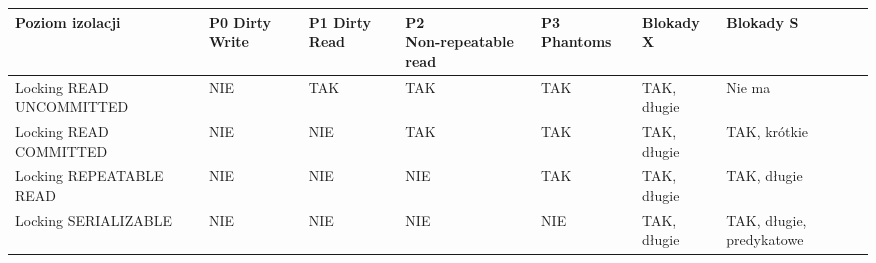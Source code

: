 \documentclass[a5paper,6pt]{article}
\begin{document}
\begin{adjustbox}{width=\columnwidth,center}
    \begin{tabular}{|p{3cm}|p{1cm}|p{1cm}|p{2cm}|p{1cm}|p{1.3cm}|p{1.3cm}|}
      \hline
      \textbf{Poziom izolacji} &
      \textbf{P0 Dirty Write} &
      \textbf{P1 Dirty Read} &
      \textbf{P2 \newline Non-repeatable read} &
      \textbf{P3 Phantoms} &
      \textbf{Blokady X} &
      \textbf{Blokady S}\\
      \hline
      Locking READ \newline UNCOMMITTED &
      \cellcolor{red!25} NIE   &
      \cellcolor{green!25} TAK &
      \cellcolor{green!25} TAK &
      \cellcolor{green!25} TAK &
      \cellcolor{yellow!25} TAK, długie &
      Nie ma\\
      \hline
      Locking READ \newline COMMITTED &
      \cellcolor{red!25} NIE   &
      \cellcolor{red!25} NIE   &
      \cellcolor{green!25} TAK &
      \cellcolor{green!25} TAK &
      \cellcolor{yellow!25} TAK, długie &
      \cellcolor{yellow!15} TAK, krótkie\\
      \hline
      Locking REPEATABLE READ  &
      \cellcolor{red!25} NIE   &
      \cellcolor{red!25} NIE   &
      \cellcolor{red!25} NIE   &
      \cellcolor{green!25} TAK &
      \cellcolor{yellow!25} TAK, długie &
      \cellcolor{yellow!25} TAK, długie\\
      \hline
      Locking \newline SERIALIZABLE &
      \cellcolor{red!25} NIE &
      \cellcolor{red!25} NIE &
      \cellcolor{red!25} NIE &
      \cellcolor{red!25} NIE &
      \cellcolor{yellow!25} TAK, długie &
      \cellcolor{blue!25} TAK, długie, predykatowe\\
      \hline

    \end{tabular}
\end{adjustbox}
    \vskip 1cm
\end{document}
